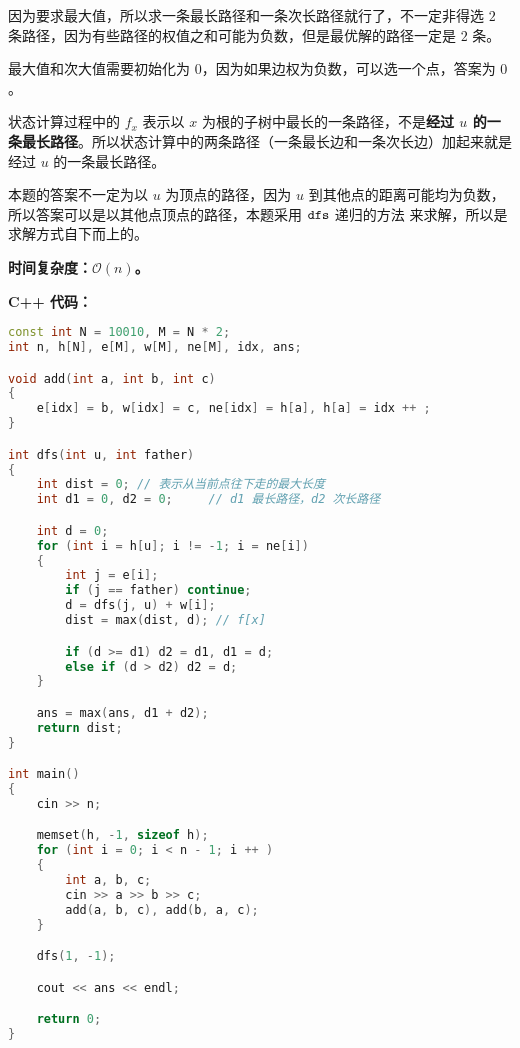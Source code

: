 因为要求最大值，所以求一条最长路径和一条次长路径就行了，不一定非得选 $2$ 条路径，因为有些路径的权值之和可能为负数，但是最优解的路径一定是 $2$ 条。

最大值和次大值需要初始化为 $0$，因为如果边权为负数，可以选一个点，答案为 $0$。

状态计算过程中的 $f_x$ 表示以 $x$ 为根的子树中最长的一条路径，不是\textbf{经过 $u$ 的一条最长路径}。所以状态计算中的两条路径（一条最长边和一条次长边）加起来就是经过 $u$ 的一条最长路径。

本题的答案不一定为以 $u$ 为顶点的路径，因为 $u$ 到其他点的距离可能均为负数，所以答案可以是以其他点顶点的路径，本题采用 $\tt dfs$ 递归的方法 来求解，所以是求解方式自下而上的。

\textbf{时间复杂度：$\mathcal{O}(n)$。}

\textbf{C++ 代码：}

\begin{lstlisting}[language=cpp]
const int N = 10010, M = N * 2;
int n, h[N], e[M], w[M], ne[M], idx, ans;

void add(int a, int b, int c)
{
    e[idx] = b, w[idx] = c, ne[idx] = h[a], h[a] = idx ++ ;
}

int dfs(int u, int father)
{
    int dist = 0; // 表示从当前点往下走的最大长度
    int d1 = 0, d2 = 0;     // d1 最长路径，d2 次长路径

    int d = 0;
    for (int i = h[u]; i != -1; i = ne[i])
    {
        int j = e[i];
        if (j == father) continue;
        d = dfs(j, u) + w[i];
        dist = max(dist, d); // f[x]

        if (d >= d1) d2 = d1, d1 = d;
        else if (d > d2) d2 = d;
    }

    ans = max(ans, d1 + d2);
    return dist;
}

int main()
{
    cin >> n;

    memset(h, -1, sizeof h);
    for (int i = 0; i < n - 1; i ++ )
    {
        int a, b, c;
        cin >> a >> b >> c;
        add(a, b, c), add(b, a, c);
    }

    dfs(1, -1);

    cout << ans << endl;

    return 0;
}
\end{lstlisting}